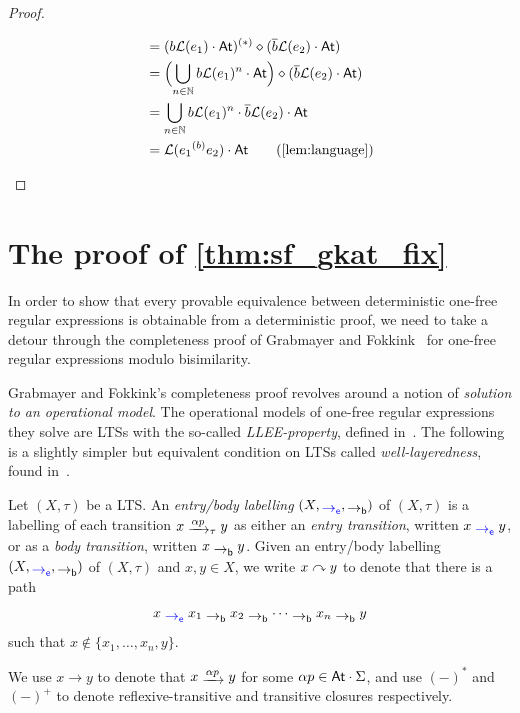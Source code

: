 \documentclass[orivec,envcountsect,envcountsame]{llncs}
\begin{document}
\begin{proof}
\begin{itemize}
\begin{align*}
			&= (b\L(e_1) \cdot \At)^{(*)} \diamond (\overline{b}\L(e_2) \cdot \At) \\
			&= \Bigl(\bigcup_{n \in \mathbb{N}} b\L(e_1)^n \cdot \At\Bigr) \diamond (\overline{b}\L(e_2) \cdot \At) \\
			&= \bigcup_{n \in \mathbb{N}} b\L(e_1)^n \cdot \overline{b}\L(e_2) \cdot \At \\
			&= \L(e_1 \while{b} e_2) \cdot \At \tag{\Cref{lem:language}}
		\end{align*}
	\end{itemize}
\end{proof}

\section{The proof of \cref{thm:sf_gkat_fix}}\label{app:proof of fix}

In order to show that every provable equivalence between deterministic one-free regular expressions is obtainable from a deterministic proof, we need to take a detour through the completeness proof of Grabmayer and Fokkink~\cite{regexlics} for one-free regular expressions modulo bisimilarity.

Grabmayer and Fokkink's completeness proof revolves around a notion of \emph{solution to an operational model}.
The operational models of one-free regular expressions they solve are LTSs with the so-called \emph{LLEE-property}, defined in~\cite{regexlics}.
The following is a slightly simpler but equivalent condition on LTSs called \emph{well-layeredness}, found in~\cite{starmfps}.

\begin{definition}
	Let \((X, \tau)\) be a LTS\@.
	An \emph{entry/body labelling} \((X, \eo, \bo)\) of \((X, \tau)\) is a labelling of each transition \(x \tr{\alpha p}_\tau y\) as either an \emph{entry transition}, written \(x \eo y\), or as a \emph{body transition}, written \(x \bo y\).
	Given an entry/body labelling \((X, \eo, \bo)\) of \((X, \tau)\) and \(x,y \in X\), we write \(x \mathrel{\curvearrowright} y\) to denote that there is a path
	\[
		x \eo x_1 \bo x_2 \bo \cdots \bo x_n \bo y
	\]
	such that \(x \notin \{x_1, \dots, x_n,y\}\).
\end{definition}

We use \(x \to y\) to denote that \(x \tr{\alpha p} y\) for some \(\alpha p \in \mathsf{At}\cdot\Sigma\), and use \((-)^*\) and \((-)^+\) to denote reflexive-transitive and transitive closures respectively.
\end{document}
